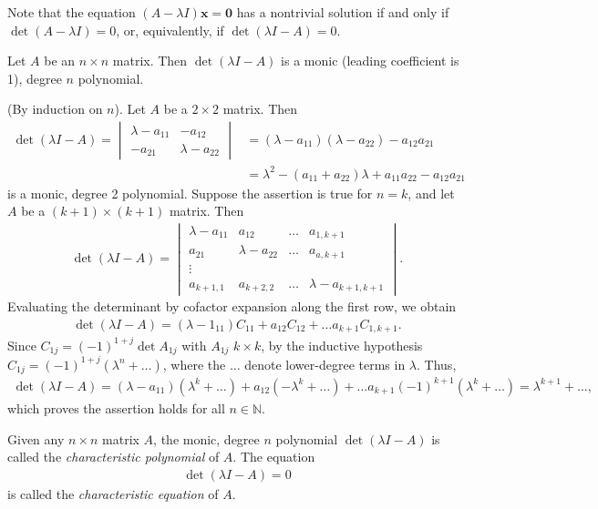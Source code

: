 \documentclass[12pt,letterpaper,reqno]{article}
\numberwithin{equation}{section}
\newcommand{\bx}{\mathbf{x}}
\begin{document}
Note that the equation $(A-\lambda I)\bx=\mathbf{0}$ has a nontrivial solution if and only if $\det (A-\lambda I)=0$, or, equivalently, if $\det (\lambda I-A)=0$.

\begin{thm}
Let $A$ be an $n \times n$ matrix. Then $\det(\lambda I-A)$ is a monic (leading coefficient is 1), degree $n$ polynomial.	
\end{thm}

\begin{pf}
(By induction on $n$). Let $A$ be a $2 \times 2$ matrix. Then
\begin{align*}
	\det (\lambda I-A)=\begin{vmatrix}
		\lambda-a_{11} & -a_{12} \\
		-a_{21} & \lambda-a_{22}
	\end{vmatrix}&=(\lambda-a_{11})(\lambda-a_{22})-a_{12}a_{21} \\
	&=\lambda^2-(a_{11}+a_{22})\lambda+a_{11}a_{22}-a_{12}a_{21}
\end{align*}	
is a monic, degree 2 polynomial. Suppose the assertion is true for $n=k$, and let $A$ be a $(k+1) \times (k+1)$ matrix. Then
\begin{align*}
	\det (\lambda I-A)=\begin{vmatrix}
		\lambda-a_{11} & a_{12} & \dots & a_{1,k+1} \\
		a_{21} & \lambda-a_{22}& \dots & a_{a,k+1} \\
		\vdots & & & \\
		a_{k+1,1} & a_{k+2,2} & \dots & \lambda-a_{k+1,k+1}
	\end{vmatrix}.
\end{align*}
Evaluating the determinant by cofactor expansion along the first row, we obtain
\begin{align*}
	\det (\lambda I-A)=(\lambda-1_{11})C_{11}+a_{12}C_{12}+\dots a_{k+1}C_{1,k+1}.
\end{align*}
Since $C_{1j}=(-1)^{1+j}\det A_{1j}$ with $A_{1j}$ $k \times k$, by the inductive hypothesis  $C_{1j}=(-1)^{1+j}(\lambda^n+\dots)$, where the $\dots$ denote lower-degree terms in $\lambda$. Thus, 
\begin{align*}
	\det (\lambda I-A)=(\lambda-a_{11})(\lambda^k+\dots)+a_{12}(-\lambda^k+\dots)+\dots a_{k+1}(-1)^{k+1}(\lambda^k+\dots)=\lambda^{k+1}+\dots,
	\end{align*}
which proves the assertion holds for all $n \in \mathbb{N}$.
\end{pf}

\begin{defn}
	Given any $n \times n$ matrix $A$, the monic, degree $n$ polynomial $\det(\lambda I-A)$ is called the \emph{characteristic polynomial} of $A$. The equation
	\begin{align*}
		\det(\lambda I-A)=0
	\end{align*}
	is called the \emph{characteristic equation} of $A$.
\end{defn}
\end{document}
